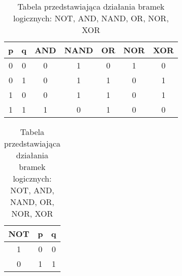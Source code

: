 \documentclass[a4paper]{article}
\begin{document}
\begin{table}[h]
\centering\caption{Tabela przedstawiająca działania bramek logicznych: NOT, AND, NAND, OR, NOR, XOR}
\begin{tabular}{|c|c|c|c|c|c|c|}
        \hline
        \hline
        p & q & AND & NAND & OR & NOR & XOR\\
        \hline
        0 & 0 & 0 & 1 & 0 & 1 & 0\\
        \hline
        0 & 1 & 0 & 1 & 1 & 0 & 1\\
        \hline
        1 & 0 & 0 & 1 & 1 & 0 & 1\\
        \hline
        1 & 1 & 1 & 0 & 1 & 0 & 0\\
        \hline
        \hline
\end{tabular}     
\begin{tabular}{|c|c|c|}
        \hline
        \hline
        NOT & p & q\\
        \hline
        1 & 0 & 0\\
        \hline
        0 & 1 & 1\\
        \hline
        \hline
\end{tabular}
\end{table}        
\end{document}

